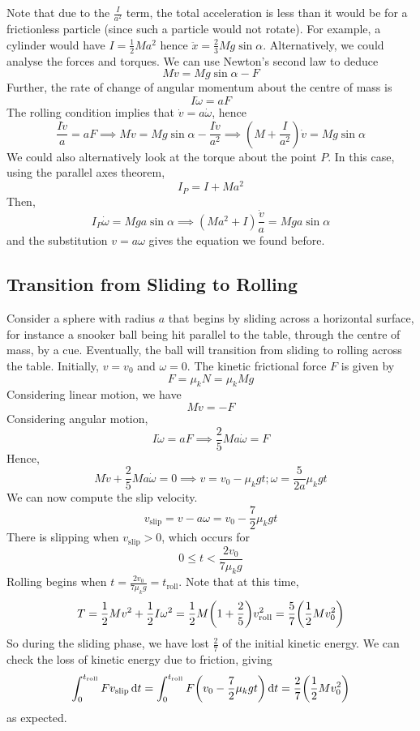 Note that due to the \(\frac{I}{a^2}\) term, the total acceleration is less than it would be for a frictionless particle (since such a particle would not rotate).
For example, a cylinder would have \(I = \frac{1}{2}Ma^2\) hence \(\ddot x = \frac{2}{3}Mg\sin\alpha\).
Alternatively, we could analyse the forces and torques.
We can use Newton's second law to deduce
\[
	M\dot v = Mg\sin\alpha - F
\]
Further, the rate of change of angular momentum about the centre of mass is
\[
	I \dot\omega = aF
\]
The rolling condition implies that \(\dot v = a \dot\omega\), hence
\[
	\frac{I\dot v}{a} = aF \implies M\dot v = Mg\sin\alpha - \frac{I\dot v}{a^2} \implies \left( M + \frac{I}{a^2} \right)\dot v = Mg\sin\alpha
\]
We could also alternatively look at the torque about the point \(P\).
In this case, using the parallel axes theorem,
\[
	I_P = I + Ma^2
\]
Then,
\[
	I_P \dot\omega = Mga\sin\alpha \implies (M a^2 + I)\frac{\dot v}{a} = Mga\sin\alpha
\]
and the substitution \(v = a\omega\) gives the equation we found before.

\subsection{Transition from Sliding to Rolling}
Consider a sphere with radius \(a\) that begins by sliding across a horizontal surface, for instance a snooker ball being hit parallel to the table, through the centre of mass, by a cue.
Eventually, the ball will transition from sliding to rolling across the table.
Initially, \(v = v_0\) and \(\omega = 0\).
The kinetic frictional force \(F\) is given by
\[
	F = \mu_k N = \mu_k Mg
\]
Considering linear motion, we have
\[
	M \dot v = -F
\]
Considering angular motion,
\[
	I\dot\omega = aF \implies \frac{2}{5}Ma \dot\omega = F
\]
Hence,
\[
	M\dot v +\frac{2}{5}Ma \dot\omega = 0 \implies v = v_0 - \mu_k g t; \omega = \frac{5}{2a}\mu_k g t
\]
We can now compute the slip velocity.
\[
	v_\text{slip} = v - a\omega = v_0 - \frac{7}{2}\mu_k gt
\]
There is slipping when \(v_\text{slip} > 0\), which occurs for
\[
	0 \leq t < \frac{2v_0}{7\mu_k g}
\]
Rolling begins when \(t = \frac{2v_0}{7\mu_k g} = t_\text{roll}\).
Note that at this time,
\[
	T = \frac{1}{2}Mv^2 + \frac{1}{2}I\omega^2 = \frac{1}{2}M\qty(1 + \frac{2}{5})v_\text{roll}^2 = \frac{5}{7}\qty( \frac{1}{2} Mv_0^2 )
\]
So during the sliding phase, we have lost \(\frac{2}{7}\) of the initial kinetic energy.
We can check the loss of kinetic energy due to friction, giving
\[
	\int_0^{t_\text{roll}} F v_\text{slip} \dd{t} = \int_0^{t_\text{roll}} F \qty(v_0 - \frac{7}{2}\mu_k gt) \dd{t} = \frac{2}{7}\qty(\frac{1}{2}Mv_0^2)
\]
as expected.
